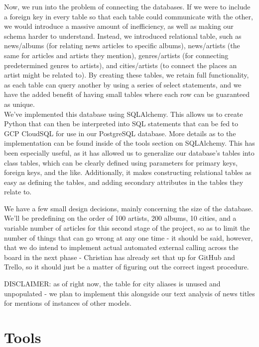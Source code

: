 \documentclass{scrartcl}
\begin{document}
    Now, we run into the problem of connecting the databases. If we were to include a foreign key in every table so that each table could communicate with the other, we would introduce a massive amount of inefficiency, as well as making our schema harder to understand. Instead, we introduced relational table, such as news/albums (for relating news articles to specific albums), news/artists (the same for articles and artists they mention), genres/artists (for connecting predetermined genres to artists), and cities/artists (to connect the places an artist might be related to). By creating these tables, we retain full functionality, as each table can query another by using a series of select statements, and we have the added benefit of having small tables where each row can be guaranteed as unique.\\

    We've implemented this database using SQLAlchemy. This allows us to create Python that can then be interpreted into SQL statements that can be fed to GCP CloudSQL for use in our PostgreSQL database. More details as to the implementation can be found inside of the tools section on SQLAlchemy. This has been especially useful, as it has allowed us to generalize our database's tables into class tables, which can be clearly defined using parameters for primary keys, foreign keys, and the like. Additionally, it makes constructing relational tables as easy as defining the tables, and adding secondary attributes in the tables they relate to.

    We have a few small design decisions, mainly concerning the size of the database. We'll be predefining on the order of 100 artists, 200 albums, 10 cities, and a variable number of articles for this second stage of the project, so as to limit the number of things that can go wrong at any one time - it should be said, however, that we do intend to implement actual automated external calling across the board in the next phase - Christian has already set that up for GitHub and Trello, so it should just be a matter of figuring out the correct ingest procedure.

    DISCLAIMER: as of right now, the table for city aliases is unused and unpopulated - we plan to implement this alongside our text analysis of news titles for mentions of instances of other models.

    \section{Tools}
\end{document}
